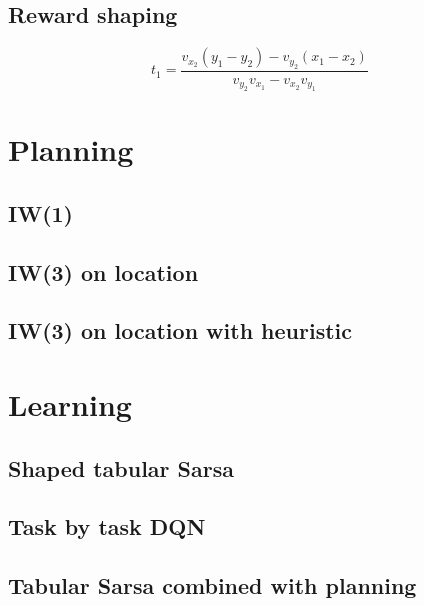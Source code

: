 

\subsection{Reward shaping\label{subsection:reward-shaping}}
\begin{equation}
  t_1 = \frac{v_{x_2}(y_1-y_2) - v_{y_2}(x_1-x_2)}{v_{y_2}v_{x_1} - v_{x_2}v_{y_1}}
\end{equation}
\section{Planning}
\subsection{\acl{IW}(1)}
\subsection{\acl{IW}(3) on location}
\subsection{\acl{IW}(3) on location with heuristic}
\section{Learning}
\subsection{Shaped tabular Sarsa}
\subsection{Task by task \acs{DQN}}
\subsection{Tabular Sarsa combined with planning}

